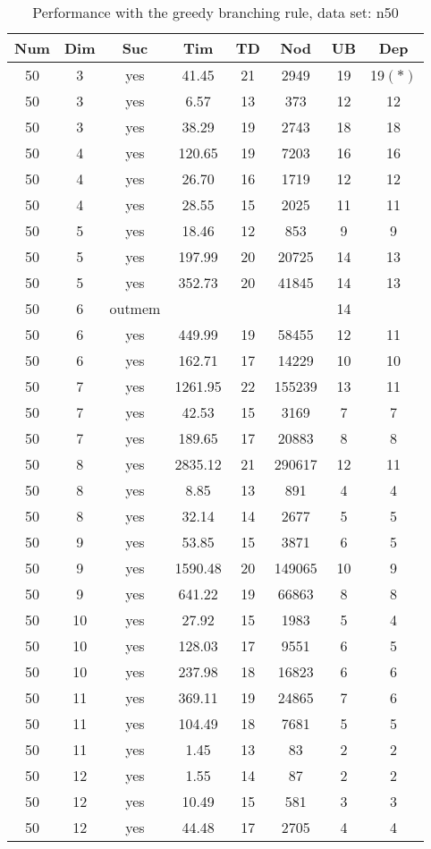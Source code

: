 \begin{table}[!htb]
  \centering
  \begin{tabular}[center]{|c|c|c|c|c|c|c|c|}
    \hline
    Num & Dim & Suc & Tim & TD & Nod & UB & Dep \\
    \hline
    50 & 3 & yes & 41.45 & 21 & 2949 & 19 & 19$(*)$ \\
    50 & 3 & yes & 6.57 & 13 & 373 & 12 & 12 \\
    50 & 3 & yes & 38.29 & 19 & 2743 & 18 & 18 \\
    50 & 4 & yes & 120.65 & 19 & 7203 & 16 & 16 \\
    50 & 4 & yes & 26.70 & 16 & 1719 & 12 & 12 \\
    50 & 4 & yes & 28.55 & 15 & 2025 & 11 & 11 \\
    50 & 5 & yes & 18.46 & 12 & 853 & 9 & 9 \\
    50 & 5 & yes & 197.99 & 20 & 20725 & 14 & 13 \\
    50 & 5 & yes & 352.73 & 20 & 41845 & 14 & 13 \\
    50 & 6 & outmem &  &  &  & 14 &  \\
    50 & 6 & yes & 449.99 & 19 & 58455 & 12 & 11 \\
    50 & 6 & yes & 162.71 & 17 & 14229 & 10 & 10 \\
    50 & 7 & yes & 1261.95 & 22 & 155239 & 13 & 11 \\
    50 & 7 & yes & 42.53 & 15 & 3169 & 7 & 7 \\
    50 & 7 & yes & 189.65 & 17 & 20883 & 8 & 8 \\
    50 & 8 & yes & 2835.12 & 21 & 290617 & 12 & 11 \\
    50 & 8 & yes & 8.85 & 13 & 891 & 4 & 4 \\
    50 & 8 & yes & 32.14 & 14 & 2677 & 5 & 5 \\
    50 & 9 & yes & 53.85 & 15 & 3871 & 6 & 5 \\
    50 & 9 & yes & 1590.48 & 20 & 149065 & 10 & 9 \\
    50 & 9 & yes & 641.22 & 19 & 66863 & 8 & 8 \\
    50 & 10 & yes & 27.92 & 15 & 1983 & 5 & 4 \\
    50 & 10 & yes & 128.03 & 17 & 9551 & 6 & 5 \\
    50 & 10 & yes & 237.98 & 18 & 16823 & 6 & 6 \\
    50 & 11 & yes & 369.11 & 19 & 24865 & 7 & 6 \\
    50 & 11 & yes & 104.49 & 18 & 7681 & 5 & 5 \\
    50 & 11 & yes & 1.45 & 13 & 83 & 2 & 2 \\
    50 & 12 & yes & 1.55 & 14 & 87 & 2 & 2 \\
    50 & 12 & yes & 10.49 & 15 & 581 & 3 & 3 \\
    50 & 12 & yes & 44.48 & 17 & 2705 & 4 & 4 \\
    \hline
  \end{tabular}
  \caption{Performance with the greedy branching rule, data set: n50}
  \label{tab:test.cutmds-n50}
\end{table}

